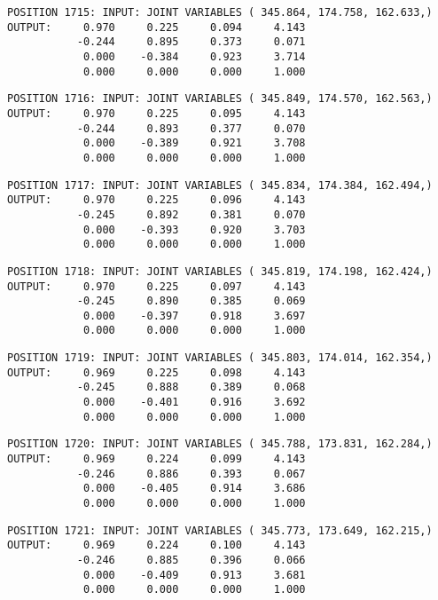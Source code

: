 \begin{verbatim}
POSITION 1715: INPUT: JOINT VARIABLES ( 345.864, 174.758, 162.633,)
OUTPUT:     0.970     0.225     0.094     4.143
           -0.244     0.895     0.373     0.071
            0.000    -0.384     0.923     3.714
            0.000     0.000     0.000     1.000
\end{verbatim} \pagebreak[1]\begin{verbatim}
POSITION 1716: INPUT: JOINT VARIABLES ( 345.849, 174.570, 162.563,)
OUTPUT:     0.970     0.225     0.095     4.143
           -0.244     0.893     0.377     0.070
            0.000    -0.389     0.921     3.708
            0.000     0.000     0.000     1.000
\end{verbatim} \pagebreak[1]\begin{verbatim}
POSITION 1717: INPUT: JOINT VARIABLES ( 345.834, 174.384, 162.494,)
OUTPUT:     0.970     0.225     0.096     4.143
           -0.245     0.892     0.381     0.070
            0.000    -0.393     0.920     3.703
            0.000     0.000     0.000     1.000
\end{verbatim} \pagebreak[1]\begin{verbatim}
POSITION 1718: INPUT: JOINT VARIABLES ( 345.819, 174.198, 162.424,)
OUTPUT:     0.970     0.225     0.097     4.143
           -0.245     0.890     0.385     0.069
            0.000    -0.397     0.918     3.697
            0.000     0.000     0.000     1.000
\end{verbatim} \pagebreak[1]\begin{verbatim}
POSITION 1719: INPUT: JOINT VARIABLES ( 345.803, 174.014, 162.354,)
OUTPUT:     0.969     0.225     0.098     4.143
           -0.245     0.888     0.389     0.068
            0.000    -0.401     0.916     3.692
            0.000     0.000     0.000     1.000
\end{verbatim} \pagebreak[1]\begin{verbatim}
POSITION 1720: INPUT: JOINT VARIABLES ( 345.788, 173.831, 162.284,)
OUTPUT:     0.969     0.224     0.099     4.143
           -0.246     0.886     0.393     0.067
            0.000    -0.405     0.914     3.686
            0.000     0.000     0.000     1.000
\end{verbatim} \pagebreak[1]\begin{verbatim}
POSITION 1721: INPUT: JOINT VARIABLES ( 345.773, 173.649, 162.215,)
OUTPUT:     0.969     0.224     0.100     4.143
           -0.246     0.885     0.396     0.066
            0.000    -0.409     0.913     3.681
            0.000     0.000     0.000     1.000
\end{verbatim} \pagebreak[1]\begin{verbatim}

\end{verbatim}
